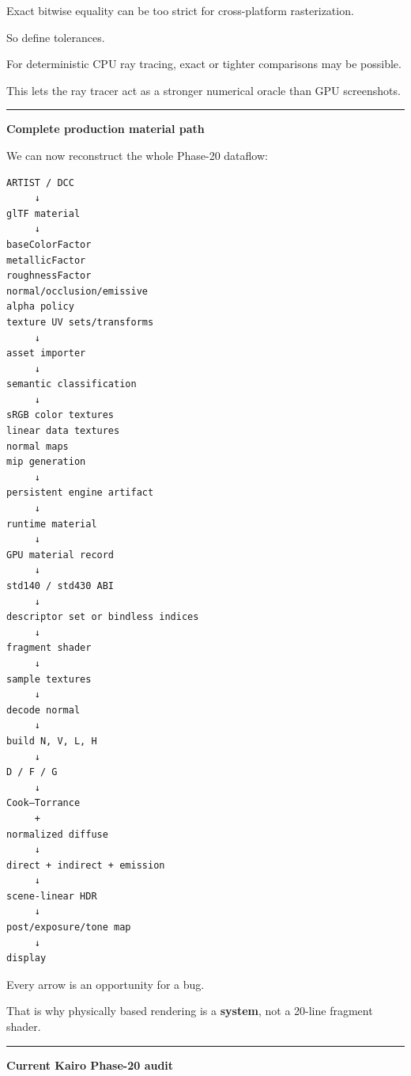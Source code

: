 Exact bitwise equality can be too strict for cross-platform rasterization.

So define tolerances.

For deterministic CPU ray tracing, exact or tighter comparisons may be possible.

This lets the ray tracer act as a stronger numerical oracle than GPU screenshots.

\begin{center}\rule{0.5\linewidth}{0.5pt}\end{center}

\textbf{Complete production material path}

We can now reconstruct the whole Phase-20 dataflow:

\begin{verbatim}
ARTIST / DCC
     ↓
glTF material
     ↓
baseColorFactor
metallicFactor
roughnessFactor
normal/occlusion/emissive
alpha policy
texture UV sets/transforms
     ↓
asset importer
     ↓
semantic classification
     ↓
sRGB color textures
linear data textures
normal maps
mip generation
     ↓
persistent engine artifact
     ↓
runtime material
     ↓
GPU material record
     ↓
std140 / std430 ABI
     ↓
descriptor set or bindless indices
     ↓
fragment shader
     ↓
sample textures
     ↓
decode normal
     ↓
build N, V, L, H
     ↓
D / F / G
     ↓
Cook–Torrance
     +
normalized diffuse
     ↓
direct + indirect + emission
     ↓
scene-linear HDR
     ↓
post/exposure/tone map
     ↓
display
\end{verbatim}

Every arrow is an opportunity for a bug.

That is why physically based rendering is a \textbf{system}, not a 20-line fragment shader.

\begin{center}\rule{0.5\linewidth}{0.5pt}\end{center}

\textbf{Current Kairo Phase-20 audit}

